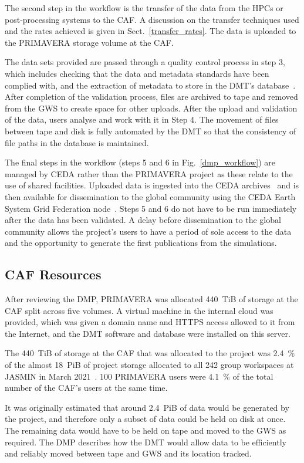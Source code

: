 \documentclass[gmd, manuscript]{copernicus}
\begin{document}
The second step in the workflow is the transfer of the data from the HPCs or post-processing systems to the CAF. A discussion on the transfer techniques used and the rates achieved is given in Sect.~\ref{transfer_rates}. The data is uploaded to the PRIMAVERA storage volume at the CAF.

The data sets provided are passed through a quality control process in step 3, which includes checking that the data and metadata standards have been complied with, and the extraction of metadata to store in the DMT's database~\citep{Seddon2020}. After completion of the validation process, files are archived to tape and removed from the GWS to create space for other uploads. After the upload and validation of the data, users analyse and work with it in Step 4. The movement of files between tape and disk is fully automated by the DMT so that the consistency of file paths in the database is maintained.

The final steps in the workflow (steps 5 and 6 in Fig.~\ref{dmp_workflow}) are managed by CEDA rather than the PRIMAVERA project as these relate to the use of shared facilities. Uploaded data is ingested into the CEDA archives~\citep{CEDAArchive} and is then available for dissemination to the global community using the CEDA Earth System Grid Federation node~\citep{CEDAESGF}. Steps 5 and 6 do not have to be run immediately after the data has been validated. A delay before dissemination to the global community allows the project's users to have a period of sole access to the data and the opportunity to generate the first publications from the simulations.


\subsection{CAF Resources}

After reviewing the DMP, PRIMAVERA was allocated 440~TiB of storage at the CAF split across five volumes. A virtual machine in the internal cloud was provided, which was given a domain name and HTTPS access allowed to it from the Internet, and the DMT software and database were installed on this server.

The 440~TiB of storage at the CAF that was allocated to the project was 2.4~\% of the almost 18~PiB of project storage allocated to all 242 group workspaces at JASMIN in March 2021~\citep{Townsend2021}. 100 PRIMAVERA users were 4.1~\% of the total number of the CAF's users at the same time. 

It was originally estimated that around 2.4~PiB of data would be generated by the project, and therefore only a subset of data could be held on disk at once. The remaining data would have to be held on tape and moved to the GWS as required. The DMP describes how the DMT would allow data to be efficiently and reliably moved between tape and GWS and its location tracked.
\end{document}
